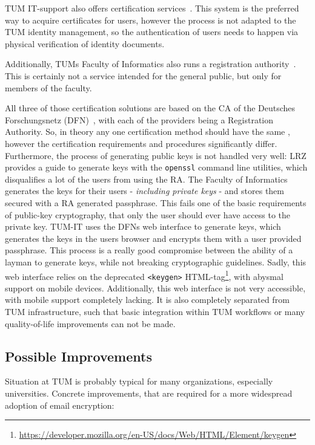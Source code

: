 TUM IT-support also offers certification services~\cite{tumZertifikat}.
This system is the preferred way to acquire certificates for users, however the process is not adapted to the TUM
identity management, so the authentication of users needs to happen via physical verification of identity documents.

Additionally, TUMs Faculty of Informatics also runs a registration authority~\cite{inTumCertificates}.
This is certainly not a service intended for the general public, but only for members of the faculty.

All three of those certification solutions are based on the CA of the Deutsches For\-schungs\-netz (DFN)~\cite{dfnPki},
with each of the providers being a Registration Authority.
So, in theory any one certification method should have the same , however the certification requirements and
procedures significantly differ.
Furthermore, the process of generating public keys is not handled very well: LRZ provides a guide to generate keys with
the \lstinline{openssl} command line utilities, which disqualifies a lot of the users from using the RA\@.
The Faculty of Informatics generates the keys for their users - \emph{including private keys} - and stores them secured
with a RA generated passphrase.
This fails one of the basic requirements of public-key cryptography, that only the user should ever have access to the
private key.
TUM-IT uses the DFNs web interface to generate keys, which generates the keys in the users browser and encrypts them
with a user provided passphrase.
This process is a really good compromise between the ability of a layman to generate keys, while not breaking
cryptographic guidelines.
Sadly, this web interface relies on the deprecated \lstinline{<keygen>}
HTML-tag\footnote{\url{https://developer.mozilla.org/en-US/docs/Web/HTML/Element/keygen}}, with abysmal support on
mobile devices.
Additionally, this web interface is not very accessible, with mobile support completely lacking.
It is also completely separated from TUM infrastructure, such that basic integration within TUM workflows or many
quality-of-life improvements can not be made.

\subsection*{Possible Improvements}
Situation at TUM is probably typical for many organizations, especially universities.
Concrete improvements, that are required for a more widespread adoption of email encryption:

